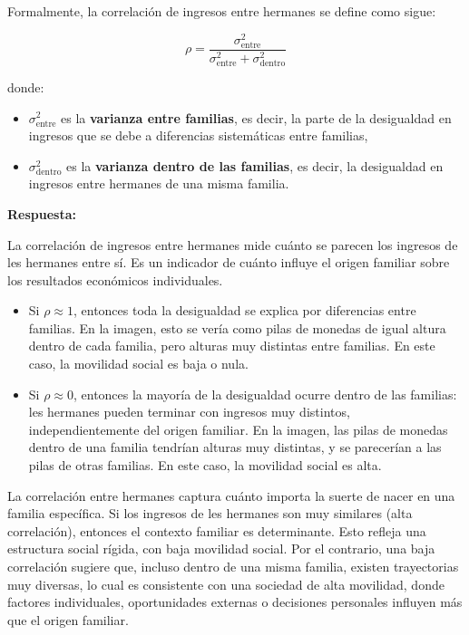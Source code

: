 \documentclass[
]{article}
\begin{document}
Formalmente, la correlación de ingresos entre hermanes se define como
sigue:

\[
\rho = \frac{\sigma^2_{\text{entre}}}{\sigma^2_{\text{entre}} + \sigma^2_{\text{dentro}}}
\]

donde:

\begin{itemize}
\item
  \(\sigma^2_{\text{entre}}\) es la \textbf{varianza entre familias}, es
  decir, la parte de la desigualdad en ingresos que se debe a
  diferencias sistemáticas entre familias,
\item
  \(\sigma^2_{\text{dentro}}\) es la \textbf{varianza dentro de las
  familias}, es decir, la desigualdad en ingresos entre hermanes de una
  misma familia.
\end{itemize}

\textbf{Respuesta:}

La correlación de ingresos entre hermanes mide cuánto se parecen los
ingresos de les hermanes entre sí. Es un indicador de cuánto influye el
origen familiar sobre los resultados económicos individuales.

\begin{itemize}
\item
  Si \(\rho \approx 1\), entonces toda la desigualdad se explica por
  diferencias entre familias. En la imagen, esto se vería como pilas de
  monedas de igual altura dentro de cada familia, pero alturas muy
  distintas entre familias. En este caso, la movilidad social es baja o
  nula.
\item
  Si \(\rho \approx 0\), entonces la mayoría de la desigualdad ocurre
  dentro de las familias: les hermanes pueden terminar con ingresos muy
  distintos, independientemente del origen familiar. En la imagen, las
  pilas de monedas dentro de una familia tendrían alturas muy distintas,
  y se parecerían a las pilas de otras familias. En este caso, la
  movilidad social es alta.
\end{itemize}

La correlación entre hermanes captura cuánto importa la suerte de nacer
en una familia específica. Si los ingresos de les hermanes son muy
similares (alta correlación), entonces el contexto familiar es
determinante. Esto refleja una estructura social rígida, con baja
movilidad social. Por el contrario, una baja correlación sugiere que,
incluso dentro de una misma familia, existen trayectorias muy diversas,
lo cual es consistente con una sociedad de alta movilidad, donde
factores individuales, oportunidades externas o decisiones personales
influyen más que el origen familiar.
\end{document}
